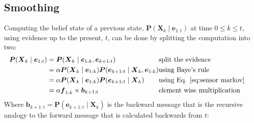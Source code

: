 \documentclass[11pt, letterpaper]{report}
\numberwithin{equation}{section}
\begin{document}
\subsection*{Smoothing}
Computing the belief state of a previous state, $\boldsymbol{P}(\boldsymbol{X}_k
\mid \boldsymbol{e}_{1:t})$ at time $0 \leq k \leq t$, using evidence up to the
present, $t$, can be done by splitting the computation into two:
\begin{equation}
  \label{eq:smoothing}
  \begin{split}
    \boldsymbol{P}(\boldsymbol{X}_k \mid \boldsymbol{e}_{1:t}) &=
    \boldsymbol{P}(\boldsymbol{X}_k \mid \boldsymbol{e}_{1:k}, \boldsymbol{e}_{k+1:t}) \\
    &= \alpha \boldsymbol{P}(\boldsymbol{X}_k \mid \boldsymbol{e}_{1:k})
    \boldsymbol{P}(\boldsymbol{e}_{k+1:t} \mid \boldsymbol{X}_k, \boldsymbol{e}_{1:k}) \\
    &= \alpha \boldsymbol{P}(\boldsymbol{X}_k \mid \boldsymbol{e}_{1:k})
    \boldsymbol{P}(\boldsymbol{e}_{k+1:t} \mid \boldsymbol{X}_k) \\
    &= \alpha \boldsymbol{f}_{1:k} \times \boldsymbol{b}_{k+1:t}
  \end{split}
  \begin{split}
    &\text{split the evidence} \\
    &\text{using Baye's rule} \\
    &\text{using Eq. \ref{eq:sensor markov}} \\
    &\text{element wise multiplication} \\
  \end{split}
\end{equation}
Where $\boldsymbol{b}_{k+1:t} = \boldsymbol{P}(\boldsymbol{e}_{k+1:t} \mid
\boldsymbol{X}_k)$ is the backward message that is the recursive analogy to the
forward message that is calculated backwards from $t$:
\end{document}
